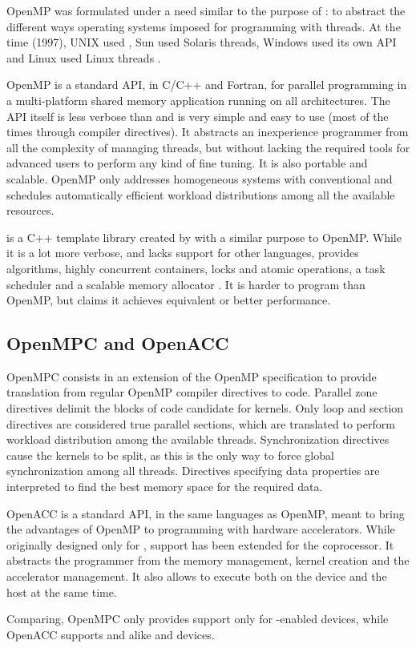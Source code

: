 \documentclass[../thesis]{subfiles}
\begin{document}
		OpenMP \cite{OpenMP,OpenMP:spec3.1} was formulated under a need similar to the purpose of \pthreads: to abstract the different ways operating systems imposed for programming with threads. At the time (1997), UNIX used \pthreads, Sun used Solaris threads, Windows used its own API and Linux used Linux threads \cite{Intel:pthreads_or_openmp}.

		OpenMP is a standard API, in C/C++ and Fortran, for parallel programming in a multi-platform shared memory application running on all architectures. The API itself is less verbose than \pthreads and is very simple and easy to use (most of the times through compiler directives). It abstracts an inexperience programmer from all the complexity of managing threads, but without lacking the required tools for advanced users to perform any kind of fine tuning. It is also portable and scalable. OpenMP only addresses homogeneous systems with conventional \cpus and schedules automatically efficient workload distributions among all the available resources.

		\intel\tbb is a C++ template library created by \intel with a similar purpose to OpenMP. While it is a lot more verbose, and lacks support for other languages, \tbb provides algorithms, highly concurrent containers, locks and atomic operations, a task scheduler and a scalable memory allocator \cite{TBB}. It is harder to program than OpenMP, but \intel claims it achieves equivalent or better performance.

		\subsection{OpenMPC and OpenACC}

		OpenMPC \cite{OpenMPC} consists in an extension of the OpenMP specification to provide translation from regular OpenMP compiler directives to \cuda code. Parallel zone directives delimit the blocks of code candidate for \cuda kernels. Only loop and section directives are considered true parallel sections, which are translated to perform workload distribution among the available threads. Synchronization directives cause the kernels to be split, as this is the only way to force global synchronization among all threads. Directives specifying data properties are interpreted to find the best \gpu memory space for the required data.

		OpenACC \cite{OpenACC:2.0} is a standard API, in the same languages as OpenMP, meant to bring the advantages of OpenMP to programming with hardware accelerators. While originally designed only for \gpus, support has been extended for the \intel\xeonphi coprocessor. It abstracts the programmer from the memory management, kernel creation and the accelerator management. It also allows to execute both on the device and the host at the same time.

		Comparing, OpenMPC only provides support only for \cuda-enabled devices, while OpenACC supports \nvidia and \amd\gpus alike and \intel\mic devices.
\end{document}
